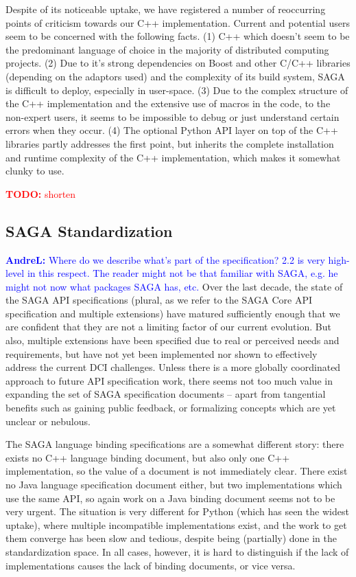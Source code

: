 \documentclass{article}
\newcommand{\B}[1]{\textbf{#1}}
\newcommand{\todo}[1]{{\textcolor{red}{\B{TODO:} #1 }}}
\newcommand{\amnote}[1]{{\textcolor{green}{   \B{AndreM:  } #1 }}}
\newcommand{\alnote}[1]{{\textcolor{blue}{    \B{AndreL:  } #1 }}}
\newcommand{\todo}[1]{}
\newcommand{\amnote}[1]{}
\newcommand{\alnote}[1]{}
\begin{document}
   Despite of its noticeable uptake, we have registered a number of reoccurring
   points of criticism towards our C++ implementation.  Current and potential
   users seem to be concerned with the following facts. 
   (1) C++ which doesn't seem to be the predominant language of choice in the
   majority of distributed computing projects.
   (2) Due to it's strong dependencies on Boost and other C/C++ libraries
   (depending on the adaptors used) and the complexity of its build system, SAGA
   is difficult to deploy, especially in user-space.
   (3) Due to the complex structure of the C++ implementation and the extensive
   use of macros in the code, to the non-expert users, it seems to be impossible
   to debug or just understand certain errors when they occur.  
   (4) The optional Python API layer on top of the C++ libraries partly addresses
   the first point, but inherits the complete installation and runtime complexity
   of the C++ implementation, which makes it somewhat clunky to use.

  \todo{shorten}


 \subsection{SAGA Standardization}
  \alnote{Where do we describe what's part of the specification? 2.2 is very 
  high-level in this respect. The reader might not be that familiar with SAGA,
  e.g. he might not now what packages SAGA has, etc.}
  Over the last decade, the state of the SAGA API specifications
  (plural, as we refer to the SAGA Core API specification and multiple
  extensions) have matured sufficiently enough that we are confident
  that they are not a limiting factor of our current evolution.  But also,
  multiple extensions have been specified due to real or perceived
  needs and requirements, but have not yet been implemented nor shown
  to effectively address the current DCI challenges.  Unless there is
  a more globally coordinated approach to future API specification
  work, there seems not too much value in expanding the set of SAGA
  specification documents -- apart from tangential benefits such as
  gaining public feedback, or formalizing concepts which are yet
  unclear or nebulous.

  The SAGA language binding specifications are a somewhat different
  story: there exists no C++ language binding document, but also only
  one C++ implementation, so the value of a document is not
  immediately clear.  There exist no Java language specification
  document either, but two implementations which use the same API, so 
  again work on a Java binding document seems not to be very urgent.  
  The situation is very different for Python (which has seen the widest 
  uptake), where multiple incompatible implementations exist, and the 
  work to get them converge has been slow and tedious, despite being 
  (partially) done in the standardization space.  In all cases, however, 
  it is hard to distinguish if the lack of implementations causes the 
  lack of binding documents, or vice versa.
  
\end{document}
